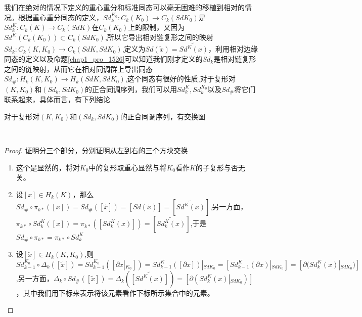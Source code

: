 我们在绝对的情况下定义的重心重分和标准同态可以毫无困难的移植到相对的情况。根据重心重分同态的定义，$Sd^{K_{0}}_{k}:C_{k}(K_{0})\rightarrow C_{k}(SdK_{0})$是$Sd^{K}_{k}:C_{k}(K)\rightarrow C_{k}(SdK)$在$C_{k}(K_{0})$上的限制，又因为$Sd^{K}(C_{k}(K_{0}))\subset C_{k}(SdK_{0})$,所以它导出相对链复形之间的映射$Sd_{k}:C_{k}(K,K_{0})\rightarrow C_{k}(SdK,SdK_{0})$,定义为$Sd(\tilde{x})=\widetilde{Sd^{K}(x)}$，利用相对边缘同态的定义以及命题\eqref{chap1_pro_1526}可以知道我们刚才定义的$Sd_{k}$是相对链复形之间的链映射，从而它在相对同调群上导出同态$Sd_{\#}:H_{k}(K,K_{0})\rightarrow H_{k}(SdK,SdK_{0})$,这个同态有很好的性质,对于复形对$(K,K_{0})$和$(Sd_{k},SdK_{0})$的正合同调序列，我们可以用$Sd_{k}^{K},Sd_{k}^{K_{0}}$以及$Sd_{\#}$将它们联系起来，具体而言，有下列结论
\begin{proposition}\label{chap3_pro_414}
对于复形对$(K,K_{0})$和$(Sd_{k},SdK_{0})$的正合同调序列，有交换图
{\center
{}\\
}
\end{proposition}
\begin{proof}
证明分三个部分，分别证明从左到右的三个方块交换
\begin{enumerate}
    \item 这个是显然的，将对$K_{0}$中的复形取重心显然与将$K_{0}$看作$K$的子复形与否无关。
    \item 设$[x]\in H_{k}(K)$，那么$Sd_{\#}\circ \pi_{k*}([x])=Sd_{\#}([\tilde{x}])=[Sd(\tilde{x})]=[\widetilde{Sd^{K}(x)}]$,另一方面，$\pi_{k*}\circ Sd_{k}^{K}([x])=\pi_{k*}\left([Sd_{k}^{K}(x)]\right)=[\widetilde{Sd_{k}^{K}(x)}]$,于是$Sd_{\#}\circ \pi_{k*}=\pi_{k*}\circ Sd_{k}^{K}$
    \item 设$[\tilde{x}]\in H_{k}(K,K_{0})$,则$Sd_{k-1}^{K_{0}}\circ \Delta_{k}([\tilde{x}])=Sd_{k-1}^{K_{0}}\left([\partial x\left|_{K_{0}}\right.]\right)=Sd_{k-1}^{K}\left([\partial x]\right)\left|_{SdK_{0}}\right.=[Sd_{k-1}^{K}(\partial x)\left|_{SdK_{0}}\right.]=[\partial(Sd_{k}^{K} (x)\left|_{SdK_{0}})\right.]$,另一方面，$\Delta_{k}\circ Sd_{\#}([\tilde{x}])=\Delta_{k}(\widetilde{[Sd^{K}(x)]})=\left[\partial(Sd_{k}^{K}(x)\left|_{SdK_{0}}\right.)\right]$，其中我们用下标来表示将该元素看作下标所示集合中的元素。
\end{enumerate}
\end{proof}
